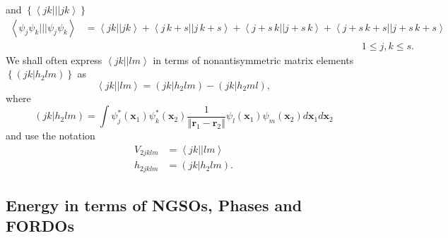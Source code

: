 \documentclass[aps,preprint]{revtex4}%
\begin{document}
and $\left\{  \left\langle jk|||jk\right\rangle \right\}  $
\begin{align}
\left\langle \psi_{j}\psi_{k}|||\psi_{j}\psi_{k}\right\rangle  &
=\left\langle jk||jk\right\rangle +\left\langle j\,k+s||j\,k+s\right\rangle
+\left\langle j+s\,k||j+s\,k\right\rangle +\left\langle
j+s\,k+s||j+s\,k+s\right\rangle \nonumber\\
&  \left.  {}\right.  \qquad\qquad\qquad\qquad\qquad\qquad\qquad\qquad
\qquad\qquad\qquad\qquad\qquad\qquad1\leq j,k\leq s.
\end{align}
We shall often express $\left\langle jk||lm\right\rangle $ in terms of
nonantisymmetric matrix elements $\left\{  \left(  \left.  jk\right\vert
h_{2}lm\right)  \right\}  $ as
\begin{equation}
\left\langle jk||lm\right\rangle =\left(  \left.  jk\right\vert h_{2}%
lm\right)  -\left(  \left.  jk\right\vert h_{2}ml\right)  ,
\end{equation}
where
\begin{equation}
\left(  \left.  jk\right\vert h_{2}lm\right)  =\int\psi_{j}^{\ast}\left(
\bm{x}_{1}\right)  \psi_{k}^{\ast}\left(  \bm{x}_{2}\right)  \frac
{1}{\left\Vert \bm{r}_{1}-\bm{r}_{2}\right\Vert }\psi_{l}\left(
\bm{x}_{1}\right)  \psi_{m}\left(  \bm{x}_{2}\right)  d\bm{x}_{1}d\bm{x}_{2}%
\end{equation}
and use the notation
\begin{align}
V_{2jklm}  &  =\left\langle jk||lm\right\rangle \nonumber\\
h_{2jklm}  &  =\left(  \left.  jk\right\vert h_{2}lm\right)  .
\end{align}


\subsection{Energy in terms of NGSOs, Phases and FORDOs\label{EnON_NGSO}}
\end{document}

